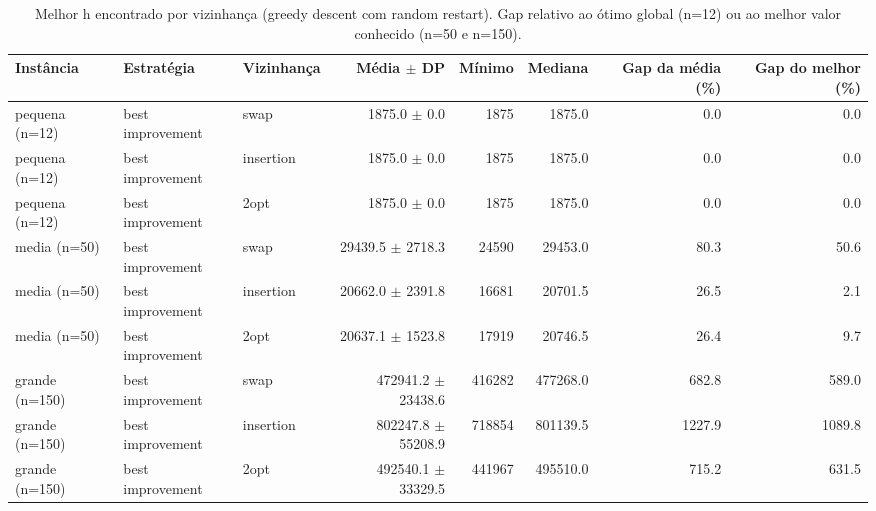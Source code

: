 \begin{table}[ht]
\centering
\small
\caption{Melhor h encontrado por vizinhança (greedy descent com random restart). Gap relativo ao ótimo global (n=12) ou ao melhor valor conhecido (n=50 e n=150).}
\label{tab:principal}
\begin{tabular}{lllrrrrr}
\hline
Instância & Estratégia & Vizinhança & Média $\pm$ DP & Mínimo & Mediana & Gap da média (\%) & Gap do melhor (\%) \\
\hline
pequena (n=12) & best improvement & swap & 1875.0 $\pm$ 0.0 & 1875 & 1875.0 & 0.0 & 0.0 \\
pequena (n=12) & best improvement & insertion & 1875.0 $\pm$ 0.0 & 1875 & 1875.0 & 0.0 & 0.0 \\
pequena (n=12) & best improvement & 2opt & 1875.0 $\pm$ 0.0 & 1875 & 1875.0 & 0.0 & 0.0 \\
\hline
media (n=50) & best improvement & swap & 29439.5 $\pm$ 2718.3 & 24590 & 29453.0 & 80.3 & 50.6 \\
media (n=50) & best improvement & insertion & 20662.0 $\pm$ 2391.8 & 16681 & 20701.5 & 26.5 & 2.1 \\
media (n=50) & best improvement & 2opt & 20637.1 $\pm$ 1523.8 & 17919 & 20746.5 & 26.4 & 9.7 \\
\hline
grande (n=150) & best improvement & swap & 472941.2 $\pm$ 23438.6 & 416282 & 477268.0 & 682.8 & 589.0 \\
grande (n=150) & best improvement & insertion & 802247.8 $\pm$ 55208.9 & 718854 & 801139.5 & 1227.9 & 1089.8 \\
grande (n=150) & best improvement & 2opt & 492540.1 $\pm$ 33329.5 & 441967 & 495510.0 & 715.2 & 631.5 \\
\hline
\end{tabular}
\end{table}
